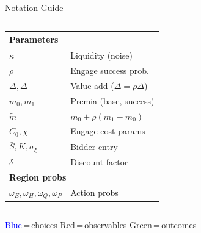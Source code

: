 \documentclass[aspectratio=169,10pt]{beamer}
\newcommand{\1}{\mathbf{1}}
\newcommand{\choice}[1]{\textcolor{blue}{#1}}
\newcommand{\obs}[1]{\textcolor{red!70!black}{#1}}
\newcommand{\outcome}[1]{\textcolor{green!50!black}{#1}}
\begin{document}
\begin{frame}{Notation Guide}
\begin{columns}[T,onlytextwidth]
\begin{tabular}{@{}ll@{}}
\toprule
\multicolumn{2}{l}{\textbf{Parameters}} \\
\midrule
$\kappa$ & Liquidity (noise) \\
$\rho$ & Engage success prob. \\
$\Delta,\tilde{\Delta}$ & Value-add ($\tilde{\Delta}=\rho\Delta$) \\
$m_0, m_1$ & Premia (base, success) \\
$\tilde{m}$ & $m_0 + \rho(m_1 - m_0)$ \\
$C_0, \chi$ & Engage cost params \\
$\bar{S}, K, \sigma_\xi$ & Bidder entry \\
$\delta$ & Discount factor \\
\midrule
\multicolumn{2}{l}{\textbf{Region probs}} \\
\midrule
$\omega_E,\omega_H,\omega_Q,\omega_P$ & Action probs \\
\bottomrule
\end{tabular}
\end{columns}

\vspace{0.3em}
\centering
{\footnotesize \choice{Blue}\,=\,choices \quad \obs{Red}\,=\,observables \quad \outcome{Green}\,=\,outcomes}
\end{frame}
\end{document}

